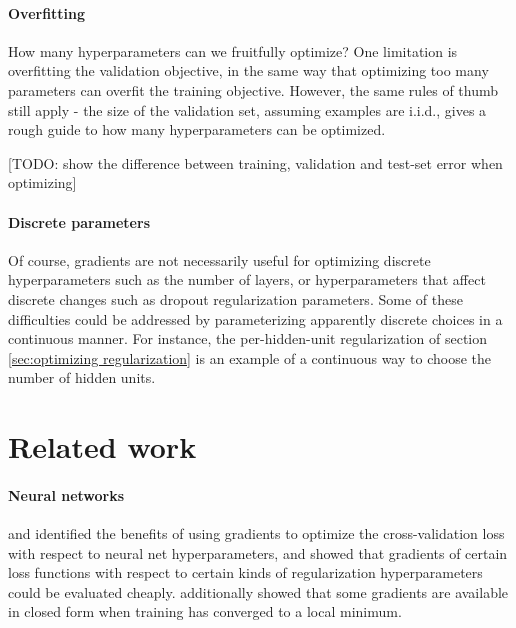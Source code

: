 \documentclass{article}
\begin{document}


\paragraph{Overfitting}
How many hyperparameters can we fruitfully optimize?
One limitation is overfitting the validation objective, in the same way that optimizing too many parameters can overfit the training objective.
However, the same rules of thumb still apply - the size of the validation set, assuming examples are i.i.d., gives a rough guide to how many hyperparameters can be optimized.

[TODO: show the difference between training, validation and test-set error when optimizing]


\paragraph{Discrete parameters}
Of course, gradients are not necessarily useful for optimizing discrete hyperparameters such as the number of layers, or hyperparameters that affect discrete changes such as dropout regularization parameters.
Some of these difficulties could be addressed by parameterizing apparently discrete choices in a continuous manner.
For instance, the per-hidden-unit regularization of section \ref{sec:optimizing regularization} is an example of a continuous way to choose the number of hidden units.




\section{Related work}


\paragraph{Neural networks}
\citet{larsen1998adaptive} and \citet{bengio2000gradient} identified the benefits of using gradients to optimize the cross-validation loss with respect to neural net hyperparameters, and showed that gradients of certain loss functions with respect to certain kinds of regularization hyperparameters could be evaluated cheaply.
\citet{bengio2000gradient} additionally showed that some gradients are available in closed form when training has converged to a local minimum.
\end{document}
